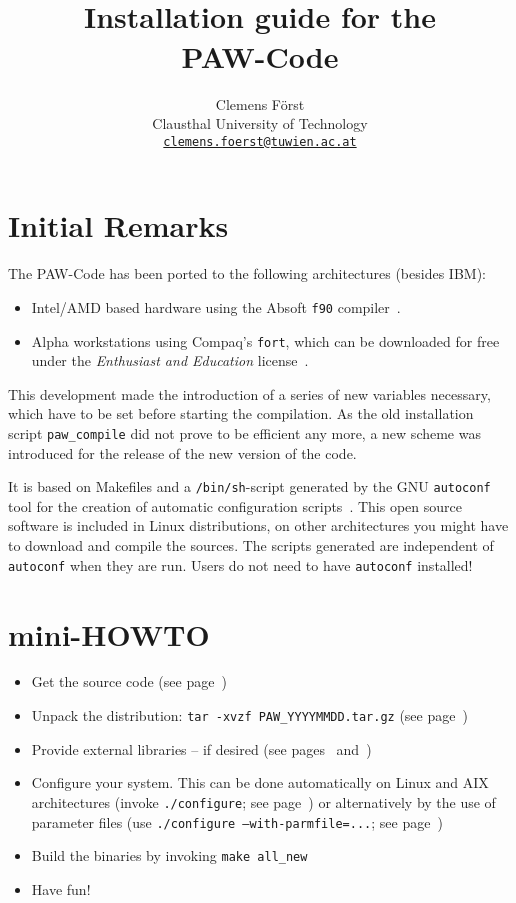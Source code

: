 \documentclass[a4paper,10pt]{article}
\title{\hrulefill \\ {\Large \bf Installation guide for the \\} 
                  {\Huge \bf PAW-Code} \\ \vspace*{-0.3cm} \hrulefill}
\author{\small  Clemens F\"orst \\ 
        \small Clausthal University of Technology \\ 
        \small \underline{\texttt{clemens.foerst@tuwien.ac.at}}}
\date{}
\begin{document}
\maketitle
\tableofcontents

\section{Initial Remarks}

The \textsc{PAW}-Code has been ported to the following architectures (besides IBM):
\begin{itemize}
  \item Intel/AMD based hardware using the Absoft \texttt{f90} compiler~\cite{f90}.
  \item Alpha workstations using Compaq's \texttt{fort}, which can be downloaded for free under the 
        \textit{Enthusiast and Education} license~\cite{fort}.
\end{itemize}
This development made the introduction of a series of new variables necessary, which have to be set
before starting the compilation.  As the old installation script
\texttt{paw\_compile} did not prove to be efficient any more, a new scheme was introduced for the release of the new version of the code.

It is based on Makefiles and a \texttt{/bin/sh}-script generated by the GNU \texttt{autoconf} tool for the creation of automatic
configuration scripts~\cite{autoconf,autoconf2}.  This open source software is
included in Linux distributions, on other architectures you might have to
download and compile the sources.  The scripts generated are independent of \texttt{autoconf} when
they are run. Users do not need to have \texttt{autoconf} installed!


\section{mini-HOWTO}

\begin{itemize}
\item Get the source code (see page~\pageref{sub:pre})
\item Unpack the distribution: \texttt{tar -xvzf PAW\_YYYYMMDD.tar.gz} (see page~\pageref{sub:unpack})
\item Provide external libraries -- if desired (see pages~\pageref{sub:libs} and~\pageref{sec:libs})
\item Configure your system. This can be done automatically on Linux and AIX
architectures (invoke \texttt{./configure}; see page~\pageref{sub:auto}) or alternatively by the use of
parameter files (use \texttt{./configure --with-parmfile=...}; see page~\pageref{sub:parms})
\item Build the binaries by invoking \texttt{make all\_new}
\item Have fun!
\end{itemize}
\end{document}
